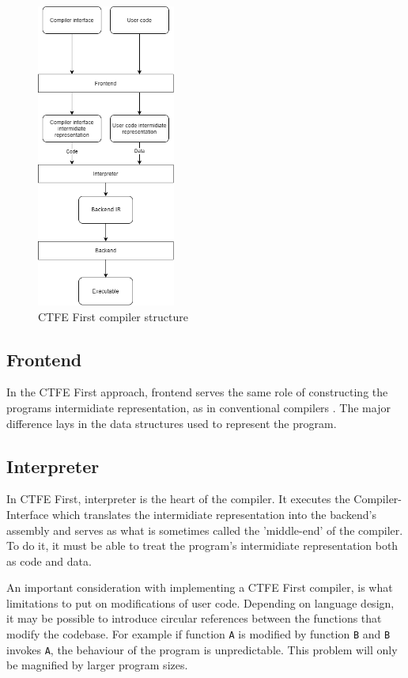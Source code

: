 \begin{figure}
	\includegraphics[height=10cm]{pictures/compiler-structure.png}
	\caption{CTFE First compiler structure}
	\label{CTFE-first-compiler-structure}
\end{figure}

\subsection{Frontend}
\label{frontend}

In the CTFE First approach, frontend serves the same role of constructing the programs intermidiate representation, as in conventional compilers \cite{puntambekar:compiler_design}.
The major difference lays in the data structures used to represent the program.

\subsection{Interpreter}
\label{interpreter}

In CTFE First, interpreter is the heart of the compiler.
It executes the Compiler-Interface which translates the intermidiate representation into the backend's assembly and serves as what is sometimes called the 'middle-end' of the compiler\cite{hsu2021llvm}.
To do it, it must be able to treat the program's intermidiate representation both as code and data.

An important consideration with implementing a CTFE First compiler, is what limitations to put on modifications of user code.
Depending on language design, it may be possible to introduce circular references between the functions that modify the codebase.
For example if function \lstinline{A} is modified by function \lstinline{B} and \lstinline{B} invokes \lstinline{A}, the behaviour of the program is unpredictable.
This problem will only be magnified by larger program sizes.

